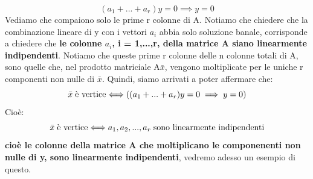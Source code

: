 \begin{equation*}
    (a_1 + ... + a_r)y = 0 \implies y = 0
\end{equation*}
Vediamo che compaiono solo le prime r colonne di A. Notiamo che chiedere che la combinazione lineare di y con i vettori $a_i$ abbia solo soluzione banale, corrisponde a chiedere che \textbf{le colonne $a_i$, i = 1,...,r, della matrice A siano linearmente indipendenti}. Notiamo che queste prime r colonne delle n colonne totali di A, sono quelle che, nel prodotto matriciale A$\bar{x}$, vengono moltiplicate per le uniche r componenti non nulle di $\bar{x}$. Quindi, siamo arrivati a poter affermare che:
\begin{equation*}
    \bar{x} \hspace{0.1cm} \text{è vertice} \Longleftrightarrow ((a_1 + ... + a_r)y = 0 \implies y = 0)
\end{equation*}
Cioè:
\begin{equation*}
    \bar{x} \hspace{0.1cm} \text{è vertice} \Longleftrightarrow a_1, a_2, ..., a_r \hspace{0.1cm} \text{sono linearmente indipendenti}
\end{equation*}
\textbf{cioè le colonne della matrice A che moltiplicano le componenenti non nulle di y, sono linearmente indipendenti}, vedremo adesso un esempio di questo.

